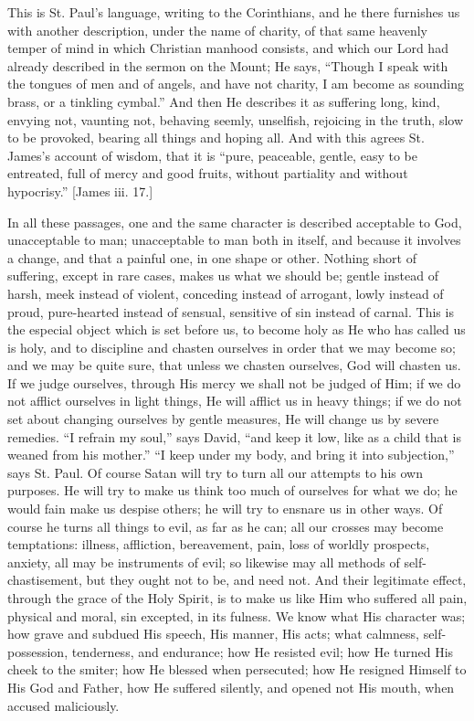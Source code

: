 This is St. Paul's language, writing to the Corinthians, and he
there furnishes us with another description, under the name of
charity, of that same heavenly temper of mind in which Christian
manhood consists, and which our Lord had already described in the
sermon on the Mount; He says, ``Though I speak with the tongues of
men and of angels, and have not charity, I am become as sounding
brass, or a tinkling cymbal.'' And then He describes it as
suffering long, kind, envying not, vaunting not, behaving seemly,
unselfish, rejoicing in the truth, slow to be provoked, bearing all
things and hoping all. And with this agrees St. James's account of
wisdom, that it is ``pure, peaceable, gentle, easy to be
entreated, full of mercy and good fruits, without partiality and
without hypocrisy.'' [James iii. 17.]

In all these passages, one and the same character is described
acceptable to God, unacceptable to man; unacceptable to man both in
itself, and because it involves a change, and that a painful one, in
one shape or other. Nothing short of suffering, except in rare cases,
makes us what we should be; gentle instead of harsh, meek instead of
violent, conceding instead of arrogant, lowly instead of proud,
pure-hearted instead of sensual, sensitive of sin instead of carnal.
This is the especial object which is set before us, to become holy as
He who has called us is holy, and to discipline and chasten ourselves
in order that we may become so; and we may be quite sure, that unless
we chasten ourselves, God will chasten us. If we judge ourselves,
through His mercy we shall not be judged of Him; if we do not afflict
ourselves in light things, He will afflict us in heavy things; if we
do not set about changing ourselves by gentle measures, He will change
us by severe remedies. ``I refrain my soul,'' says David,
``and keep it low, like as a child that is weaned from his
mother.'' ``I keep under my body, and bring it into
subjection,'' says St. Paul. Of course Satan will try to turn all
our attempts to his own purposes. He will try to make us think too
much of ourselves for what we do; he would fain make us despise
others; he will try to ensnare us in other ways. Of course he turns
all things to evil, as far as he can; all our crosses may become
temptations: illness, affliction, bereavement, pain, loss of worldly
prospects, anxiety, all may be instruments of evil; so likewise may
all methods of self-chastisement, but they ought not to be, and need
not. And their legitimate effect, through the grace of the Holy
Spirit, is to make us like Him who suffered all pain, physical and
moral, sin excepted, in its fulness. We know what His character was;
how grave and subdued His speech, His manner, His acts; what calmness,
self-possession, tenderness, and endurance; how He resisted evil; how
He turned His cheek to the smiter; how He blessed when persecuted; how
He resigned Himself to His God and Father, how He suffered silently,
and opened not His mouth, when accused maliciously.

